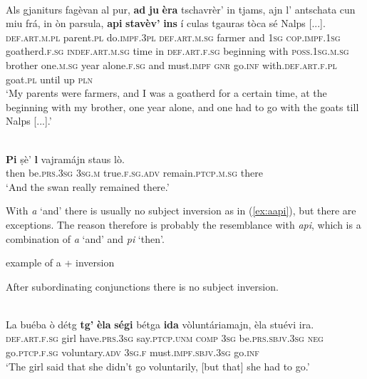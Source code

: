 \ea
\label{ex:aapi}
\\
\gll    Als gjaniturs fagèvan al pur, \textbf{ad} \textbf{ju} \textbf{èra} tschavrèr’ in tjams, ajn l’ antschata cun miu frá, in òn parsula, \textbf{api} \textbf{stavèv’} \textbf{ins} í culas tgauras tòca sé Nalps [...]. \\
\textsc{def.art.m.pl} parent.\textsc{pl} do.\textsc{impf.3pl} \textsc{def.art.m.sg} farmer and \textsc{1sg} \textsc{cop.impf.1sg} goatherd.\textsc{f.sg} \textsc{indef.art.m.sg} time in \textsc{def.art.f.sg} beginning with \textsc{poss.1sg.m.sg} brother one.\textsc{m.sg} year alone.\textsc{f.sg}  and  must.\textsc{impf} \textsc{gnr} go.\textsc{inf} with.\textsc{def.art.f.pl} goat.\textsc{pl} until up  \textsc{pln} \\
\glt `My parents were farmers, and I was a goatherd for a certain time, at the beginning with my brother, one year alone, and one had to go with the goats till Nalps [...].'
\z


\ea
\label{ex:aapi1}
\\
	\gll   \textbf{Pi} ṣè’ \textbf{l} vajramájn staus lò. \\
	then be.\textsc{prs.3sg} \textsc{3sg.m} true.\textsc{f.sg.adv} remain.\textsc{ptcp.m.sg} there\\
\glt `And the swan really remained there.'
\z

With \textit{a} `and' there is usually no subject inversion as in (\ref{ex:aapi}), but there are exceptions. The reason therefore is probably the resemblance with \textit{api}, which is a combination of \textit{a} `and' and \textit{pi} `then'.

example of a + inversion

After subordinating conjunctions there is no subject inversion.

\ea
\label{}
 {\citealt[132]{Büchli1966}}\\
\gll    La buéba ò détg \textbf{tg'} \textbf{èla} \textbf{ségi} bétga \textbf{ida} vòluntáriamajn, èla stuévi ira.\\
\textsc{def.art.f.sg} girl have.\textsc{prs.3sg} say.\textsc{ptcp.unm} \textsc{comp} \textsc{3sg} be.\textsc{prs.sbjv.3sg} \textsc{neg} go.\textsc{ptcp.f.sg} voluntary.\textsc{adv} \textsc{3sg.f} must.\textsc{impf.sbjv.3sg} go.\textsc{inf}\\
\glt `The girl said that she didn't go voluntarily, [but that] she had to go.'
\z

